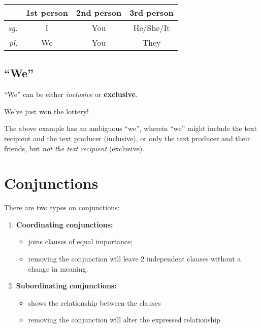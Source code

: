 \documentclass[../main.tex]{subfiles}
\begin{document}
	\begin{center}
		\begin{tabular}{rccc}
			\hline \hline
			& \textbf{1st person} & \textbf{2nd person} & \textbf{3rd person} \\ 
			\hline 
			\textit{sg.} & I & You & He/She/It \\ 
			\textit{pl.} & We & You & They \\ 
			\hline \hline
		\end{tabular} 
	\end{center}

	
	\subsection{``We''}
	``We'' can be either \textit{inclusive} or \textbf{exclusive}.
	\begin{exe}
		\ex We've just won the lottery!
	\end{exe}
	The above example has an ambiguous ``we'', wherein ``we'' might include the text recipient and the text producer (inclusive), or only the text producer and their friends, but \textit{not the text recipient} (exclusive).
	
	\section{Conjunctions}
	
	There are two types on conjunctions:
	\begin{enumerate}
		\item \textbf{Coordinating conjunctions:} \begin{itemize}
			\item joins clauses of equal importance;
			\item removing the conjunction will leave 2 independent clauses without a change in meaning.
		\end{itemize}
		\item \textbf{Subordinating conjunctions:} \begin{itemize}
			\item shows the relationship between the clauses
			\item removing the conjunction will alter the expressed relationship
		\end{itemize}
	\end{enumerate}
	
\end{document}
